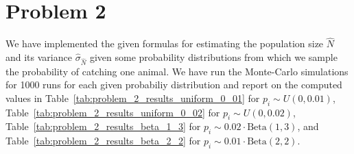\documentclass{article}
\begin{document}


\pagebreak
\section*{Problem 2}


We have implemented the given formulas for estimating the population size $\hat{N}$ and its variance $\hat{\sigma}_{\hat{N}}$ given some probability distributions from which we sample the probability of catching one animal. 
We have run the Monte-Carlo simulations for 1000 runs for each given probabiliy distribution and report on the computed values in Table~\ref{tab:problem_2_results_uniform_0_01} for $p_i \sim U(0, 0.01)$, Table~\ref{tab:problem_2_results_uniform_0_02} for $p_i \sim U(0, 0.02)$, Table~\ref{tab:problem_2_results_beta_1_3} for $p_i \sim 0.02 \cdot \mathrm{Beta}(1, 3)$, and Table~\ref{tab:problem_2_results_beta_2_2} for $p_i \sim 0.01 \cdot \mathrm{Beta}(2, 2)$.
\end{document}
